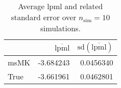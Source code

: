 \begin{table}[H]

\caption{Average lpml and related standard error over $n_{\text{sim}} = 10$ simulations.}
\centering
\begin{tabular}[t]{lrr}
\toprule
  & $\overbar{\text{lpml}}$ & $\text{sd}(\overbar{\text{lpml}})$\\
\midrule
msMK & -3.684243 & 0.0456340\\
True & -3.661961 & 0.0462801\\
\bottomrule
\end{tabular}
\end{table}